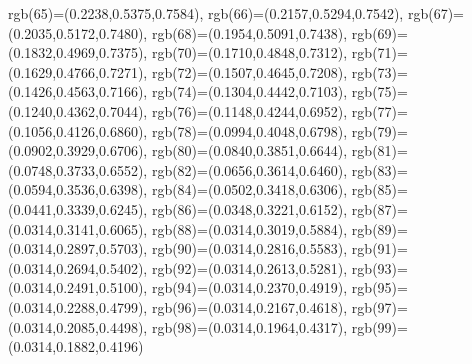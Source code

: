 {{        rgb(65)=(0.2238,0.5375,0.7584),
        rgb(66)=(0.2157,0.5294,0.7542),
        rgb(67)=(0.2035,0.5172,0.7480),
        rgb(68)=(0.1954,0.5091,0.7438),
        rgb(69)=(0.1832,0.4969,0.7375),
        rgb(70)=(0.1710,0.4848,0.7312),
        rgb(71)=(0.1629,0.4766,0.7271),
        rgb(72)=(0.1507,0.4645,0.7208),
        rgb(73)=(0.1426,0.4563,0.7166),
        rgb(74)=(0.1304,0.4442,0.7103),
        rgb(75)=(0.1240,0.4362,0.7044),
        rgb(76)=(0.1148,0.4244,0.6952),
        rgb(77)=(0.1056,0.4126,0.6860),
        rgb(78)=(0.0994,0.4048,0.6798),
        rgb(79)=(0.0902,0.3929,0.6706),
        rgb(80)=(0.0840,0.3851,0.6644),
        rgb(81)=(0.0748,0.3733,0.6552),
        rgb(82)=(0.0656,0.3614,0.6460),
        rgb(83)=(0.0594,0.3536,0.6398),
        rgb(84)=(0.0502,0.3418,0.6306),
        rgb(85)=(0.0441,0.3339,0.6245),
        rgb(86)=(0.0348,0.3221,0.6152),
        rgb(87)=(0.0314,0.3141,0.6065),
        rgb(88)=(0.0314,0.3019,0.5884),
        rgb(89)=(0.0314,0.2897,0.5703),
        rgb(90)=(0.0314,0.2816,0.5583),
        rgb(91)=(0.0314,0.2694,0.5402),
        rgb(92)=(0.0314,0.2613,0.5281),
        rgb(93)=(0.0314,0.2491,0.5100),
        rgb(94)=(0.0314,0.2370,0.4919),
        rgb(95)=(0.0314,0.2288,0.4799),
        rgb(96)=(0.0314,0.2167,0.4618),
        rgb(97)=(0.0314,0.2085,0.4498),
        rgb(98)=(0.0314,0.1964,0.4317),
        rgb(99)=(0.0314,0.1882,0.4196)
    }
}
